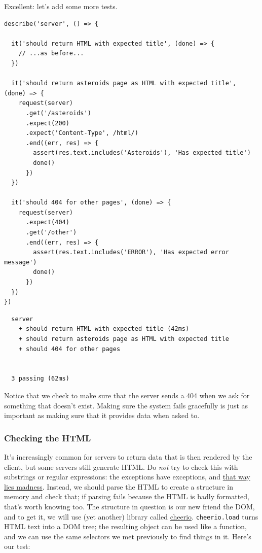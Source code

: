 Excellent: let's add some more tests.

\begin{verbatim}
describe('server', () => {

  it('should return HTML with expected title', (done) => {
    // ...as before...
  })

  it('should return asteroids page as HTML with expected title', (done) => {
    request(server)
      .get('/asteroids')
      .expect(200)
      .expect('Content-Type', /html/)
      .end((err, res) => {
        assert(res.text.includes('Asteroids'), 'Has expected title')
        done()
      })
  })

  it('should 404 for other pages', (done) => {
    request(server)
      .expect(404)
      .get('/other')
      .end((err, res) => {
        assert(res.text.includes('ERROR'), 'Has expected error message')
        done()
      })
  })
})
\end{verbatim}

\begin{verbatim}
  server
    + should return HTML with expected title (42ms)
    + should return asteroids page as HTML with expected title
    + should 404 for other pages


  3 passing (62ms)
\end{verbatim}

Notice that we check to make sure that the server sends a 404 when we
ask for something that doesn't exist. Making sure the system fails
gracefully is just as important as making sure that it provides data
when asked to.

\subsubsection{Checking the HTML}\label{s:testing-html}

It's increasingly common for servers to return data that is then
rendered by the client, but some servers still generate HTML. Do
\emph{not} try to check this with substrings or regular expressions: the
exceptions have exceptions, and
\href{https://stackoverflow.com/a/1732454}{that way lies madness}.
Instead, we should parse the HTML to create a structure in memory and
check that; if parsing fails because the HTML is badly formatted, that's
worth knowing too. The structure in question is our new friend the DOM,
and to get it, we will use (yet another) library called
\href{https://cheerio.js.org/}{cheerio}. \texttt{cheerio.load} turns
HTML text into a DOM tree; the resulting object can be used like a
function, and we can use the same selectors we met previously to find
things in it. Here's our test:

